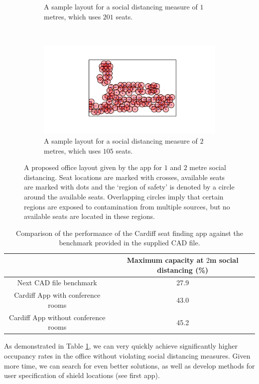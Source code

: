 \documentclass[11pt,a4paper]{article}
\begin{document}
\begin{figure}[ht!]
\begin{subfigure}[h]{0.49\linewidth}
\caption{A sample layout for a social distancing measure of $1$ metres, which uses $201$ seats.}
\label{OneMetre}
\end{subfigure}
~
\begin{subfigure}[h]{0.490\linewidth}
\centering
\includegraphics[width = \linewidth]{best_2m_next.png}
\caption{A sample layout for a social distancing measure of $2$ metres, which uses $105$ seats.}
\label{TwoMetre}
\end{subfigure}
\caption{A proposed office layout given by the app for $1$ and $2$ metre social distancing. Seat locations are marked with crosses, available seats are marked with dots and the `region of safety' is denoted by a circle around the available seats. Overlapping circles imply that certain regions are exposed to contamination from multiple sources, but no available seats are located in these regions. }
\label{Demonstration_pics}
\end{figure}


\begin{table}[ht!]
\begin{center}
 \begin{tabular}{|c |c|} 
 \hline
& \textbf{Maximum capacity at $2$m social distancing (\%)}\\ 
 \hline
 Next CAD file benchmark &   27.9\\ 
 \hline
 Cardiff App  with conference rooms& 43.0\\
\hline
Cardiff App without conference rooms & 45.2\\
 \hline
\end{tabular}
\end{center}
\caption{Comparison of the performance of the Cardiff seat finding app against the benchmark provided in the supplied CAD file.}
\label{tab:performance}
\end{table}


As demonstrated in Table \ref{tab:performance}, we can very quickly achieve significantly higher occupancy rates in the office without violating social distancing measures. Given more time, we can search for even better solutions, as well as develop methods for user specification of shield locations (see first app).
\end{document}

